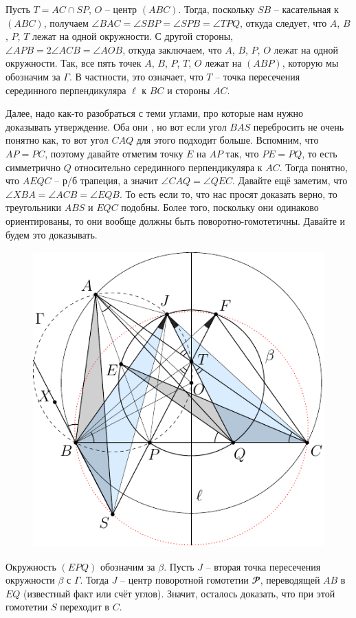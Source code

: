 \documentclass[14pt]{extarticle}
\renewcommand{\P}{\mathbfcal{P}}
\begin{document}
Пусть \(T = AC \cap SP\), \(O\) -- центр \((ABC)\). Тогда, 
поскольку \(SB\) -- касательная к \((ABC)\), получаем 
\(\angle BAC = \angle SBP = 
\angle SPB = \angle TPQ\), откуда следует, что 
\(A\), \(B\), \(P\), \(T\) лежат на одной окружности.
С другой стороны, \(\angle APB = 2\angle ACB = \angle AOB\), 
откуда заключаем, что \(A\), \(B\), \(P\), \(O\) лежат на 
одной окружности. Так, все пять точек \(A\), \(B\), \(P\), 
\(T\), \(O\) лежат на \((ABP)\), которую мы обозначим за 
\(\Gamma\). В частности, это означает, 
что \(T\) -- точка пересечения серединного перпендикуляра 
\(\ell\) к \(BC\) и стороны \(AC\). 

Далее, надо как-то разобраться с теми углами, про которые нам 
нужно доказывать утверждение. Оба они , но 
вот если угол \(BAS\) перебросить не очень понятно как, то вот 
угол \(CAQ\) для этого подходит больше. Вспомним, что 
\(AP = PC\), поэтому давайте отметим точку \(E\) на \(AP\) так, 
что \(PE = PQ\), то есть симметрично \(Q\) относительно серединного перпендикуляра к \(AC\). Тогда понятно, что \(AEQC\) -- р/б 
трапеция, а значит \(\angle CAQ = \angle QEC\). Давайте ещё заметим, что \(\angle XBA = \angle ACB = \angle EQB\). То есть если то, 
что нас просят доказать верно, то треугольники \(ABS\) и \(EQC\) 
подобны. Более того, поскольку они одинаково ориентированы, то 
они вообще должны быть поворотно-гомотетичны. 
Давайте и будем это доказывать. 

\begin{figure}[H]
    \centering
    \includegraphics[height=11.4cm]{fig.pdf}
\end{figure}
Окружность \((EPQ)\) обозначим за \(\beta\). Пусть \(J\) -- вторая точка пересечения окружности \(\beta\) с \(\Gamma\). Тогда 
\(J\) -- центр поворотной гомотетии \(\P\), переводящей 
\(AB\) в \(EQ\) (известный факт или счёт углов). 
Значит, осталось доказать, что при этой гомотетии \(S\) 
переходит в \(C\).
\end{document}
